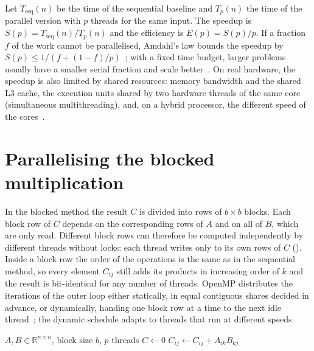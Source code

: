 \documentclass[12pt,a4paper]{report}
\begin{document}
Let $T_{\text{seq}}(n)$ be the time of the sequential baseline and $T_p(n)$ the time of the parallel version with
$p$ threads for the same input. The speedup is $S(p) = T_{\text{seq}}(n) / T_p(n)$ and the efficiency is
$E(p) = S(p)/p$. If a fraction $f$ of the work cannot be parallelised, Amdahl's law bounds the speedup by
$S(p) \le 1 / \left(f + (1-f)/p\right)$~\cite{amdahl1967}; with a fixed time budget, larger problems usually have a
smaller serial fraction and scale better~\cite{gustafson1988}. On real hardware, the speedup is also limited by
shared resources: memory bandwidth and the shared L3 cache, the execution units shared by two hardware threads of
the same core (simultaneous multithreading), and, on a hybrid processor, the different speed of the
cores~\cite{hennessy2017}.

\section{Parallelising the blocked multiplication}

In the blocked method the result $C$ is divided into rows of $b \times b$ blocks. Each block row of $C$ depends on
the corresponding rows of $A$ and on all of $B$, which are only read. Different block rows can therefore be computed
independently by different threads without locks: each thread writes only to its own rows of $C$
(). Inside a block row the order of the operations is the same as in the sequential method, so every
element $C_{ij}$ still adds its products in increasing order of $k$ and the result is bit-identical for any number of
threads. OpenMP distributes the iterations of the outer loop either statically, in equal contiguous shares decided in
advance, or dynamically, handing one block row at a time to the next idle thread~\cite{openmp52}; the dynamic schedule
adapts to threads that run at different speeds.

\begin{algorithm}[H]
\caption{Parallel blocked multiplication (rows of blocks distributed among threads)}
\label{alg:par}
\begin{algorithmic}[1]
\Require $A, B \in \mathbb{R}^{n \times n}$, block size $b$, $p$ threads
\State $C \gets 0$
           \State $C_{ij} \gets C_{ij} + A_{ik} B_{kj}$ \EndFor
        \EndFor
      \EndFor
    \EndFor
  \EndFor
\EndFor
\end{algorithmic}
\end{algorithm}
\end{document}
